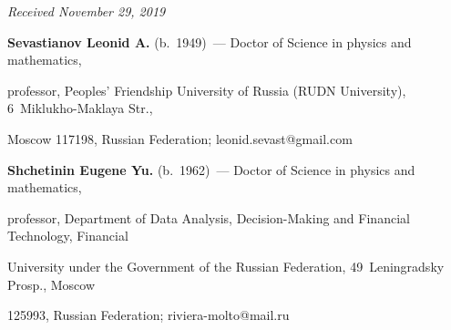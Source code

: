 


\hfill{\small\textit{Received November 29, 2019}}







  

\Contr



\noindent

\textbf{Sevastianov Leonid A.} (b.\ 1949)~--- Doctor of Science in physics and mathematics, 

professor, Peoples' Friendship University of Russia (RUDN University), 6~Miklukho-Maklaya Str., 

Moscow 117198, Russian Federation; \mbox{leonid.sevast@gmail.com}



\vspace*{3pt}



\noindent

\textbf{Shchetinin Eugene Yu.} (b.\ 1962)~--- Doctor of Science in physics and mathematics, 

professor, Department of Data Analysis, Decision-Making and Financial Technology, Financial 

University under the Government of the Russian Federation, 49~Leningradsky Prosp., Moscow 

125993, Russian Federation; \mbox{riviera-molto@mail.ru} 

  



  

\label{end\stat}



\renewcommand{\bibname}{\protect\rm Литература} 

